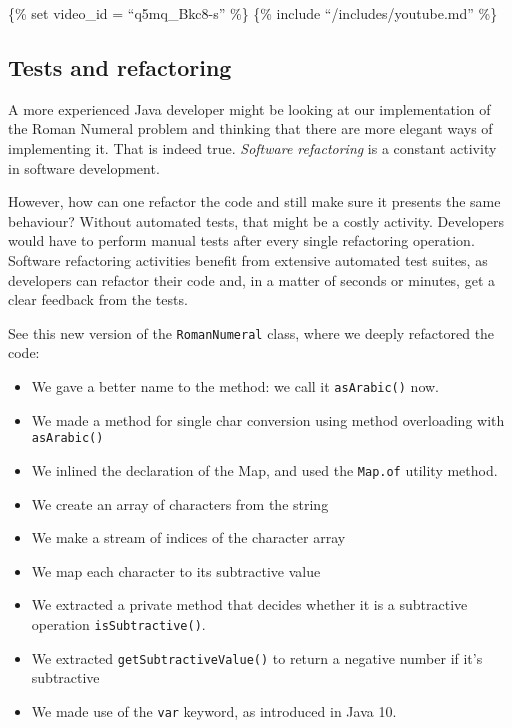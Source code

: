 \{\% set video\_id = ``q5mq\_Bkc8-s'' \%\} \{\% include
``/includes/youtube.md'' \%\}

\hypertarget{tests-and-refactoring}{%
\subsection{Tests and refactoring}\label{tests-and-refactoring}}

A more experienced Java developer might be looking at our implementation
of the Roman Numeral problem and thinking that there are more elegant
ways of implementing it. That is indeed true. \emph{Software
refactoring} is a constant activity in software development.

However, how can one refactor the code and still make sure it presents
the same behaviour? Without automated tests, that might be a costly
activity. Developers would have to perform manual tests after every
single refactoring operation. Software refactoring activities benefit
from extensive automated test suites, as developers can refactor their
code and, in a matter of seconds or minutes, get a clear feedback from
the tests.

See this new version of the \texttt{RomanNumeral} class, where we deeply
refactored the code:

\begin{itemize}
\tightlist
\item
  We gave a better name to the method: we call it \texttt{asArabic()}
  now.
\item
  We made a method for single char conversion using method overloading
  with \texttt{asArabic()}
\item
  We inlined the declaration of the Map, and used the \texttt{Map.of}
  utility method.
\item
  We create an array of characters from the string
\item
  We make a stream of indices of the character array
\item
  We map each character to its subtractive value
\item
  We extracted a private method that decides whether it is a subtractive
  operation \texttt{isSubtractive()}.
\item
  We extracted \texttt{getSubtractiveValue()} to return a negative
  number if it's subtractive
\item
  We made use of the \texttt{var} keyword, as introduced in Java 10.
\end{itemize}

